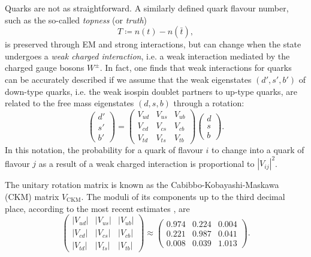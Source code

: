 Quarks are not as straightforward.
A similarly defined quark flavour number, such as the so-called \textit{topness} (or \textit{truth})
\begin{equation}
T
\coloneqq
n(t) - n(\bar{t}),
\end{equation}
is preserved through EM and strong interactions, but can change when the state undergoes a \textit{weak charged interaction}, i.e. a weak interaction mediated by the charged gauge bosons $W^\pm$. In fact, one finds that weak interactions for quarks can be accurately described if we assume that the weak eigenstates $(d',s',b')$ of down-type quarks, i.e. the weak isospin doublet partners to up-type quarks, are related to the free mass eigenstates $(d,s,b)$ through a rotation:
\begin{equation}
	\begin{pmatrix}
		d' \\
		s' \\
		b'
	\end{pmatrix}
	=
	\begin{pmatrix}
		V_{ud} & V_{us} & V_{ub} \\
		V_{cd} & V_{cs} & V_{cb} \\
		V_{td} & V_{ts} & V_{tb}
	\end{pmatrix}
	\begin{pmatrix}
		d \\
		s \\
		b
	\end{pmatrix}.
	\label{eq:CKM-matrix-mixing}
\end{equation}
In this notation, the probability for a quark of flavour $i$ to change into a quark of flavour $j$ as a result of a weak charged interaction is proportional to ${\left| V_{ij} \right|}^2$.

The unitary rotation matrix is known as the Cabibbo-Kobayashi-Maskawa (CKM) matrix $V_\text{CKM}$. The moduli of its components up to the third decimal place, according to the most recent estimates \cite{PDG}, are
\begin{equation}
	\begin{pmatrix}
		\left|V_{ud}\right| & \left|V_{us}\right| & \left|V_{ub}\right| \\
		\left|V_{cd}\right| & \left|V_{cs}\right| & \left|V_{cb}\right| \\
		\left|V_{td}\right| & \left|V_{ts}\right| & \left|V_{tb}\right|
	\end{pmatrix}
	\approx 
	\begin{pmatrix}
		0.974 & 0.224 & 0.004 \\
		0.221 & 0.987 & 0.041 \\
		0.008 & 0.039 & 1.013
	\end{pmatrix}.
	\label{eq:CKM-matrix-numerical}
\end{equation}

